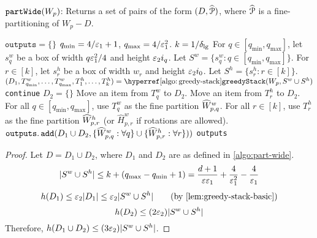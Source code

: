 \begin{algorithm}[!htb]
\caption{$\operatorname{\mathtt{partWide}}(W_p)$:
Returns a set of pairs of the form $(D, \widehat{\mathcal{P}})$,
where $\widehat{\mathcal{P}}$ is a fine-partitioning of $W_p - D$.}
\label{algo:part-wide}
\begin{algorithmic}[1]
\State $\texttt{outputs} = \{\}$
\State $q_{\min} = 4/\varepsilon_1+1$, $q_{\max} = 4/\varepsilon_1^2$.
\State $k = 1/\delta_{\mathrm{lg}}$
        \State For $q \in [q_{\min}, q_{\max}]$, let $s_q^w$ be a box of width
            $q\varepsilon_1^2/4$ and height $\varepsilon_2 i_q$.
        \State Let $S^w = \{s_q^w: q \in [q_{\min}, q_{\max}]\}$.
        \State For $r \in [k]$, let $s_r^h$ be a box of width $w_r$ and height $\varepsilon_2 i_0$.
        \State Let $S^h = \{s_r^h: r \in [k]\}$.
        \State $(D_1, T_{q_{\min}}^w, \ldots, T_{q_{\max}}^w, T_1^h, \ldots, T_k^h)
            = \greedyStackHyp(W_p, S^w \cup S^h)$
            \State \texttt{continue}
        \EndIf
        \State $D_2 = \{\}$
                \State Move an item from $T_q^w$ to $D_2$.
            \EndWhile
        \EndFor
                \State Move an item from $T_r^h$ to $D_2$.
            \EndWhile
        \EndFor
        \State For all $q \in [q_{\min}, q_{\max}]$,
            use $T_q^w$ as the fine partition $\widehat{W}^w_{p,q}$.
        \State For all $r \in [k]$, use $T_r^h$ as the fine partition $\widehat{W}^h_{p,r}$
            (or $\widehat{H}^w_{p,r}$ if rotations are allowed).
        \State $\operatorname{\mathtt{outputs.add}}(D_1 \cup D_2, \{\widehat{W}^w_{p,q}: \forall q\}
            \cup \{\widehat{W}^h_{p,r}: \forall r\}))$
    \EndFor
\EndFor
\State \Return \texttt{outputs}
\end{algorithmic}
\end{algorithm}

\rthmPartWideDiscard*
\begin{proof}
Let $D = D_1 \cup D_2$, where $D_1$ and $D_2$ are as defined in \cref{algo:part-wide}.
\[ |S^w \cup S^h| \le k + (q_{\max} - q_{\min} + 1)
= \frac{d+1}{\varepsilon\varepsilon_1} + \frac{4}{\varepsilon_1^2} - \frac{4}{\varepsilon_1} \]
\[ h(D_1) \le \epsSmall|D_1| \le \epsSmall|S^w \cup S^h|  \tag{by \cref{lem:greedy-stack-basic}} \]
\[ h(D_2) \le (2\varepsilon_2)|S^w \cup S^h| \]
Therefore, $h(D_1 \cup D_2) \le (3\varepsilon_2)|S^w \cup S^h|$.
\end{proof}

